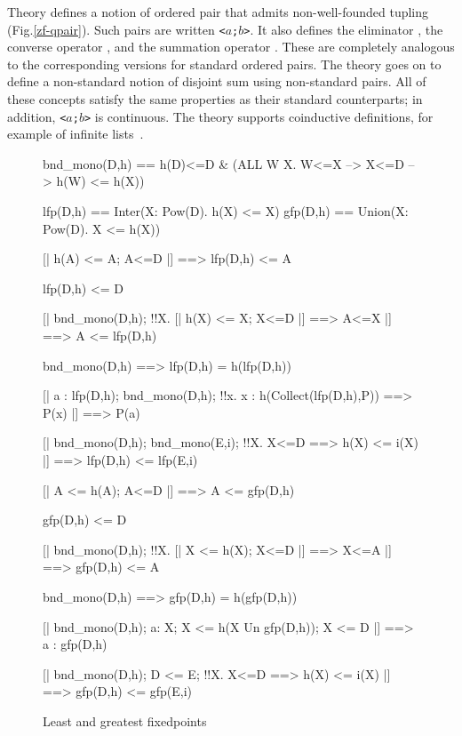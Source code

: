 Theory  defines a notion of ordered pair that admits
non-well-founded tupling (Fig.\ts\ref{zf-qpair}).  Such pairs are written
{\tt<$a$;$b$>}.  It also defines the eliminator , the
converse operator , and the summation operator
.  These are completely analogous to the corresponding
versions for standard ordered pairs.  The theory goes on to define a
non-standard notion of disjoint sum using non-standard pairs.  All of these
concepts satisfy the same properties as their standard counterparts; in
addition, {\tt<$a$;$b$>} is continuous.  The theory supports coinductive
definitions, for example of infinite lists~\cite{paulson-mscs}.

\begin{figure}
\begin{ttbox}
   bnd_mono(D,h) == 
                 h(D)<=D & (ALL W X. W<=X --> X<=D --> h(W) <= h(X))

        lfp(D,h) == Inter({\ttlbrace}X: Pow(D). h(X) <= X{\ttrbrace})
        gfp(D,h) == Union({\ttlbrace}X: Pow(D). X <= h(X){\ttrbrace})


 [| h(A) <= A;  A<=D |] ==> lfp(D,h) <= A

     lfp(D,h) <= D

   [| bnd_mono(D,h);  
                  !!X. [| h(X) <= X;  X<=D |] ==> A<=X 
               |] ==> A <= lfp(D,h)

     bnd_mono(D,h) ==> lfp(D,h) = h(lfp(D,h))

         [| a : lfp(D,h);  bnd_mono(D,h);
                  !!x. x : h(Collect(lfp(D,h),P)) ==> P(x)
               |] ==> P(a)

       [| bnd_mono(D,h);  bnd_mono(E,i);
                  !!X. X<=D ==> h(X) <= i(X)  
               |] ==> lfp(D,h) <= lfp(E,i)

 [| A <= h(A);  A<=D |] ==> A <= gfp(D,h)

     gfp(D,h) <= D

      [| bnd_mono(D,h);  
                  !!X. [| X <= h(X);  X<=D |] ==> X<=A
               |] ==> gfp(D,h) <= A

     bnd_mono(D,h) ==> gfp(D,h) = h(gfp(D,h))

       [| bnd_mono(D,h); a: X; X <= h(X Un gfp(D,h)); X <= D 
               |] ==> a : gfp(D,h)

       [| bnd_mono(D,h);  D <= E;
                  !!X. X<=D ==> h(X) <= i(X)  
               |] ==> gfp(D,h) <= gfp(E,i)
\end{ttbox}
\caption{Least and greatest fixedpoints} \label{zf-fixedpt}
\end{figure}

